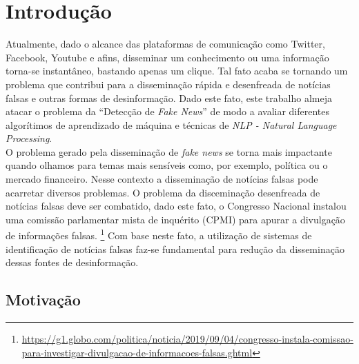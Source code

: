 \section{Introdução}

Atualmente, dado o alcance das plataformas de comunicação como Twitter, Facebook, Youtube e afins, disseminar um conhecimento ou uma informação torna-se instantâneo, bastando apenas um clique. Tal fato acaba se tornando um problema que contribui para a disseminação rápida e desenfreada de notícias falsas e outras formas de desinformação. Dado este fato, este trabalho almeja atacar o problema da ``Detecção de \textit{Fake News}'' de modo a avaliar diferentes algorítimos de aprendizado de máquina e técnicas de \textit{NLP - \textit{Natural Language Processing}}. \\


O problema gerado pela disseminação de \textit{fake news} se torna mais impactante quando olhamos para temas mais sensíveis como, por exemplo, política ou o mercado financeiro. Nesse contexto a disseminação de notícias falsas pode acarretar diversos problemas. O problema da disceminação desenfreada de notícias falsas deve ser combatido, dado este fato, o Congresso Nacional instalou uma comissão parlamentar mista de inquérito (CPMI)  para apurar a divulgação de informações falsas. \footnote{\url{https://g1.globo.com/politica/noticia/2019/09/04/congresso-instala-comissao-para-investigar-divulgacao-de-informacoes-falsas.ghtml}} Com base neste fato, a utilização de sistemas de identificação de notícias falsas faz-se fundamental para redução da disseminação dessas fontes de desinformação.



\subsection{Motivação}

